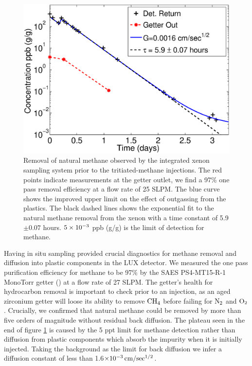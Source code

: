 \renewcommand{\baselinestretch}{1}
\small\normalsize
\begin{figure}[h!]\centering
\includegraphics[width=120mm]{Chapter_T/Figures/July_CH4_wOG.eps}
\caption{Removal of natural methane observed by the integrated xenon sampling system prior to the tritiated-methane injections. The red points indicate measurements at the getter outlet, we find a 97\% one pass removal efficiency at a flow rate of 25 SLPM. The blue curve shows the improved upper limit on the effect of outgassing from the plastics. The black dashed lines shows the exponential fit to the natural methane removal from the xenon with a time constant of 5.9 $\pm 0.07$ hours. $\rm 5\times10^{-3}$ ppb (g/g) is the limit of detection for methane.}
\label{fig:Removal_Methane}
\end{figure}
\renewcommand{\baselinestretch}{2}
\small\normalsize

Having in situ sampling provided crucial diagnostics for methane removal and diffusion into plastic components in the LUX detector. We measured the one pass purification efficiency for methane to be 97\% by the SAES PS4-MT15-R-1 MonoTorr getter (\cite{SAES}) at a flow rate of 27 SLPM. The getter's health for hydrocarbon removal is important to check prior to an injection, as an aged zirconium getter will loose its ability to remove $\rm CH_4$ before failing for $\rm N_2$ and $\rm O_2$ \cite{Dobi_CH4}. Crucially, we confirmed that natural methane could be removed by more than five orders of magnitude without residual back diffusion. The plateau seen in the end of figure \ref{fig:Removal_Methane} is caused by the 5 ppt limit for methane detection rather than diffusion from plastic components which absorb the impurity when it is initially injected. Taking the background as the limit for back diffusion we infer a diffusion constant of less than 1.6$\rm \times 10^{-3} \, cm/sec^{1/2} $. 


